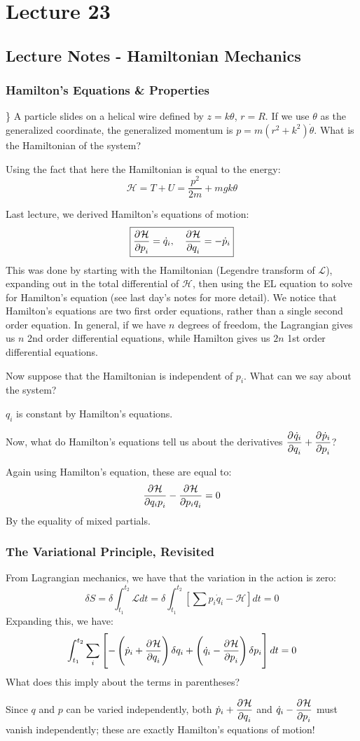 \section{Lecture 23}
\subsection{Lecture Notes - Hamiltonian Mechanics}
\subsubsection{Hamilton's Equations \& Properties} \}
A particle slides on a helical wire defined by $z = k\theta$, $r = R$. If we use $\theta$ as the generalized coordinate, the generalized momentum is $p = m(r^2 + k^2)\dot{\theta}$. What is the Hamiltonian of the system?
\begin{s}
    Using the fact that here the Hamiltonian is equal to the energy:
    \[\mathcal{H} = T + U = \frac{p^2}{2m} + mgk\theta\]
\end{s}
Last lecture, we derived Hamilton's equations of motion:
\[\boxed{\dpd{\mathcal{H}}{p_i} = \dot{q}_i, \quad \dpd{\mathcal{H}}{q_i} = - \dot{p}_i}\]
This was done by starting with the Hamiltonian (Legendre transform of $\mathcal{L}$), expanding out in the total differential of $\mathcal{H}$, then using the EL equation to solve for Hamilton's equation (see last day's notes for more detail). We notice that Hamilton's equations are two first order equations, rather than a single second order equation. In general, if we have $n$ degrees of freedom, the Lagrangian gives us $n$ 2nd order differential equations, while Hamilton gives us $2n$ 1st order differential equations. 

\noindent Now suppose that the Hamiltonian is independent of $p_i$. What can we say about the system?
\begin{s}
$q_i$ is constant by Hamilton's equations.
\end{s}

Now, what do Hamilton's equations tell us about the derivatives $\dpd{\dot{q}_i}{q_i} + \dpd{\dot{p}_i}{p_i}$?
\begin{s}
Again using Hamilton's equation, these are equal to:
\[\dpd{\HH}{q_ip_i} - \dpd{\HH}{p_iq_i} = 0\]
By the equality of mixed partials.
\end{s}

\subsubsection{The Variational Principle, Revisited}
From Lagrangian mechanics, we have that the variation in the action is zero:
\[\delta S = \delta \int_{t_1}^{t_2}\mathcal{L}dt = \delta \int_{t_1}^{t_2}[\sum p_i\dot{q}_i - \mathcal{H}]dt = 0\]
Expanding this, we have:
\[\int_{t_1}^{t_2}\sum_i \left[-\left(\dot{p}_i + \dpd{\HH}{q_i}\right)\delta q_i + \left(\dot{q}_i - \dpd{\HH}{p_i}\right)\delta p_i\right] dt = 0\]
What does this imply about the terms in parentheses?
\begin{s}
Since $q$ and $p$ can be varied independently, both $\dot{p}_i + \dpd{\HH}{q_i}$ and $\dot{q}_i - \dpd{\HH}{p_i}$ must vanish independently; these are exactly Hamilton's equations of motion!
\end{s}

